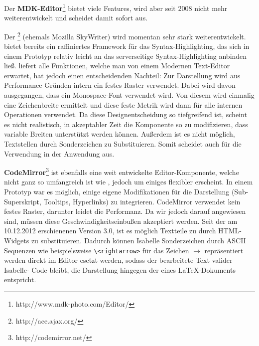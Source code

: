 \begin{description} 

\item {Der \textbf{MDK-Editor}\footnote{http://www.mdk-photo.com/Editor/}} bietet viele Features,
wird aber seit 2008 nicht mehr weiterentwickelt und scheidet damit sofort aus.

\item {Der \textbf{}\footnote{http://ace.ajax.org/}} (ehemals Mozilla SkyWriter) wird
momentan sehr stark weiterentwickelt.  bietet bereits ein raffiniertes Framework für das
Syntax-Highlighting, das sich in einem Prototyp relativ leicht an das serverseitige
Syntax-Highlighting anbinden ließ.  liefert alle Funktionen, welche man von einem Modernen
Text-Editor erwartet, hat jedoch einen entscheidenden Nachteil: Zur Darstellung wird aus
Performance-Gründen intern ein festes Raster verwendet. Dabei wird davon ausgegangen, dass ein
Monospace-Font verwendet wird. Von diesem wird einmalig eine Zeichenbreite ermittelt und diese feste
Metrik wird dann für alle internen Operationen verwendet. Da diese Designentscheidung so
tiefgreifend ist, scheint es nicht realistisch, in akzeptabler Zeit die Komponente so zu
modifizieren, dass variable Breiten unterstützt werden können. Außerdem ist es nicht möglich,
Textstellen durch Sonderzeichen zu Substituieren. Somit scheidet auch  für die Verwendung
in der Anwendung aus.

\item {\textbf{CodeMirror}\footnote{http://codemirror.net/}} ist ebenfalls eine weit entwickelte
Editor-Komponente, welche nicht ganz so umfangreich ist wie , jedoch um einiges flexibler
erscheint. In einem Prototyp war es möglich, einige eigene Modifikationen für die Darstellung (Sub-
Superskript, Tooltips, Hyperlinks) zu integrieren. CodeMirror verwendet kein festes Raster, darunter
leidet die Performanz. Da wir jedoch darauf angewiesen sind, müssen diese Geschwindigkeitseinbußen
akzeptiert werden. Seit der am 10.12.2012 erschienenen Version 3.0, ist es möglich Textteile zu
durch HTML-Widgets zu substituieren. Dadurch können Isabelle Sonderzeichen durch ASCII Sequenzen wie
beispielsweise \texttt{\textbackslash\textless rightarrow\textgreater} für das Zeichen $\rightarrow$
repräsentiert werden direkt im Editor esetzt werden, sodass der bearbeitete Text valider Isabelle-
Code bleibt, die Darstellung hingegen der eines \LaTeX-Dokuments entspricht.

\end{description}

